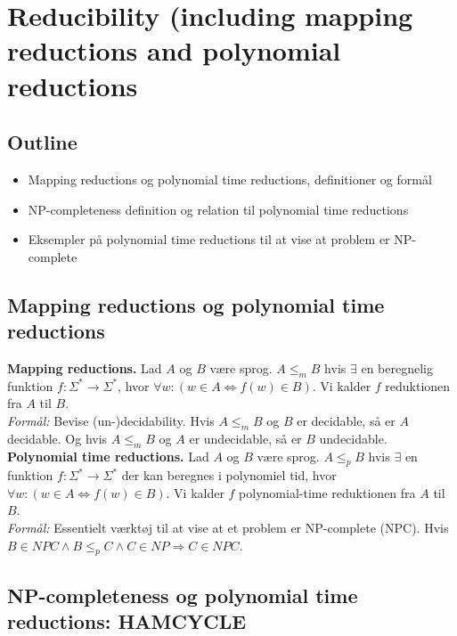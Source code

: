\section{Reducibility (including mapping reductions and polynomial reductions}

\subsection*{Outline}

\begin{itemize}
	\item Mapping reductions og polynomial time reductions, definitioner og formål
	\item NP-completeness definition og relation til polynomial time reductions
	\item Eksempler på polynomial time reductions til at vise at problem er NP-complete
\end{itemize}

\subsection*{Mapping reductions og polynomial time reductions}

\textbf{Mapping reductions.} Lad $A$ og $B$ være sprog. $A \le_m B$ hvis $\exists$ en beregnelig funktion $f: \Sigma^* \rightarrow \Sigma^*$, hvor $\forall w: (w \in A \Longleftrightarrow f(w) \in B)$. Vi kalder $f$ reduktionen fra $A$ til $B$. \\

\textit{Formål:} Bevise (un-)decidability. Hvis $A \le_m B$ og $B$ er decidable, så er $A$ decidable. Og hvis $A \le_m B$ og $A$ er undecidable, så er $B$ undecidable. \\

\textbf{Polynomial time reductions.} Lad $A$ og $B$ være sprog. $A \le_p B$ hvis $\exists$ en funktion $f: \Sigma^* \rightarrow \Sigma^*$ der kan beregnes i polynomiel tid, hvor $\forall w: (w \in A \Longleftrightarrow f(w) \in B)$. Vi kalder $f$ polynomial-time reduktionen fra $A$ til $B$. \\

\textit{Formål:} Essentielt værktøj til at vise at et problem er NP-complete (NPC). Hvis $B \in NPC \wedge B \le_p C \wedge C \in NP \Longrightarrow C \in NPC$.


\subsection*{NP-completeness og polynomial time reductions: HAMCYCLE}

